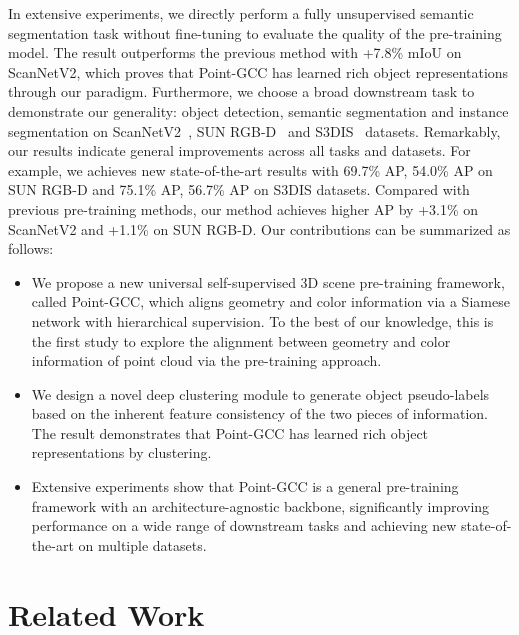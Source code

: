 \documentclass{article}
\begin{document}
In extensive experiments, we directly perform a fully unsupervised semantic segmentation task without fine-tuning to evaluate the quality of the pre-training model. The result outperforms the previous method with +7.8\% mIoU on ScanNetV2, which proves that Point-GCC has learned rich object representations through our paradigm. 
Furthermore, we choose a broad downstream task to demonstrate our generality: object detection, semantic segmentation and instance segmentation on 
ScanNetV2~\cite{dai2017scannet}, SUN RGB-D~\cite{song2015sun} and S3DIS~\cite{armeni_cvpr16} datasets. 
Remarkably, our results indicate general improvements across all tasks and datasets. For example, we achieves new state-of-the-art results with 69.7\% AP, 54.0\% AP on SUN RGB-D and 75.1\% AP, 56.7\% AP on S3DIS datasets. Compared with previous pre-training methods, our method achieves higher AP by +3.1\% on ScanNetV2 and +1.1\% on SUN RGB-D.
Our contributions can be summarized as follows:
\begin{itemize}[leftmargin=15pt, topsep=0pt, 
itemsep=0pt, parsep=2pt, partopsep=0pt
]
    \item We propose a new universal self-supervised 3D scene pre-training framework, called Point-GCC, which aligns geometry and color information via a Siamese network with hierarchical supervision. To the best of our knowledge, this is the ﬁrst study to explore the alignment between geometry and color information of point cloud via the pre-training approach.
    \item We design a novel deep clustering module to generate object pseudo-labels based on the inherent feature consistency of the two pieces of information. The result demonstrates that Point-GCC has learned rich object representations by clustering.
    \item Extensive experiments show that Point-GCC is a general pre-training framework with an architecture-agnostic backbone, significantly improving performance on a wide range of downstream tasks and achieving new state-of-the-art on multiple datasets.
\end{itemize} \section{Related Work}
\vspace{-0.2cm}
\end{document}
